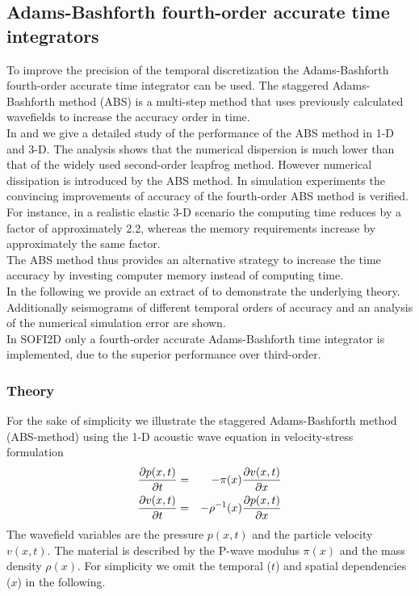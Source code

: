 \documentclass[11pt,onecolumn,oneside]{article}
\begin{document}
\subsection{Adams-Bashforth fourth-order accurate time integrators}
To improve the precision of the temporal discretization the Adams-Bashforth fourth-order accurate time integrator can be used. 
The staggered Adams-Bashforth method (ABS) is a multi-step method that uses previously calculated wavefields to increase the accuracy order in time.\\
In \cite{bohlen2015higher2} and \cite{bohlen2015higher} we give a detailed study of the performance of the ABS method in 1-D and 3-D. The analysis shows that the numerical dispersion is much lower than that of the widely used second-order leapfrog method. However numerical dissipation is introduced by the ABS method. In simulation experiments the convincing improvements of accuracy of the fourth-order ABS method is verified. For instance, in a realistic elastic 3-D scenario the computing time reduces by a factor of approximately 2.2, whereas the memory requirements increase by approximately the same factor.\\
The ABS method thus provides an alternative strategy to increase the time accuracy by investing computer memory instead of computing time.\\

In the following we provide an extract of \cite{bohlen2015higher2} to demonstrate the underlying theory. Additionally seismograms of different temporal orders of accuracy and an analysis of the numerical simulation error are shown.\\ 
In SOFI2D only a fourth-order accurate Adams-Bashforth time integrator is implemented, due to the superior performance over third-order.
\subsubsection{Theory}
For the sake of simplicity we illustrate the staggered Adams-Bashforth method (ABS-method) using the 1-D acoustic wave equation in velocity-stress formulation
\begin{eqnarray}
\frac{\partial p(x,t)}{\partial t}&=& - \pi (x) \frac{\partial v(x,t)}{\partial x}  \notag \\
\frac{\partial v(x,t)}{\partial t}&=& -\rho^{-1}(x) \frac{\partial p(x,t)}{\partial x}
\label{waveequation}
\end{eqnarray}
The wavefield variables are the pressure $p(x,t)$ and the particle velocity $v(x,t)$. The material is described by the P-wave modulus $\pi (x)$ and the mass density $\rho(x)$. For simplicity we omit the temporal ($t$) and spatial dependencies ($x$)  in the following.
\end{document}

